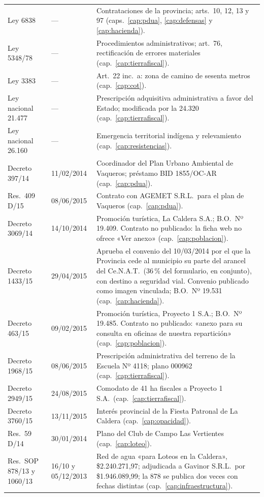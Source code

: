 \begin{longtable}{@{}p{3.2cm}p{1.9cm}p{7.9cm}@{}}
Ley 6838 & --- & Contrataciones de la provincia; arts.\ 10, 12, 13 y 97 (caps.\ \ref{cap:pdua}, \ref{cap:defensas} y \ref{cap:hacienda}). \\
Ley 5348/78 & --- & Procedimientos administrativos; art.\ 76, rectificación de errores materiales (cap.\ \ref{cap:tierrafiscal}). \\
Ley 3383 & --- & Art.\ 22 inc.\ a: zona de camino de sesenta metros (cap.\ \ref{cap:cot}). \\
Ley nacional 21.477 & --- & Prescripción adquisitiva administrativa a favor del Estado; modificada por la 24.320 (cap.\ \ref{cap:tierrafiscal}). \\
Ley nacional 26.160 & --- & Emergencia territorial indígena y relevamiento (cap.\ \ref{cap:resistencias}). \\
Decreto 397/14 & 11/02/2014 & Coordinador del Plan Urbano Ambiental de Vaqueros; préstamo BID 1855/OC-AR (cap.\ \ref{cap:pdua}). \\
Res.\ 409 D/15 & 08/06/2015 & Contrato con AGEMET S.R.L.\ para el plan de Vaqueros (cap.\ \ref{cap:pdua}). \\
Decreto 3069/14 & 14/10/2014 & Promoción turística, La Caldera S.A.; B.O.\ Nº 19.409. Contrato no publicado: la ficha web no ofrece «Ver anexo» (cap.\ \ref{cap:poblacion}). \\
Decreto 1433/15 & 29/04/2015 & Aprueba el convenio del 10/03/2014 por el que la Provincia cede al municipio su parte del arancel del Ce.N.A.T.\ (36\,\% del formulario, en conjunto), con destino a seguridad vial. Convenio publicado como imagen vinculada; B.O.\ Nº 19.531 (cap.\ \ref{cap:hacienda}). \\
Decreto 463/15 & 09/02/2015 & Promoción turística, Proyecto 1 S.A.; B.O.\ Nº 19.485. Contrato no publicado: «anexo para su consulta en oficinas de nuestra repartición» (cap.\ \ref{cap:poblacion}). \\
Decreto 1968/15 & 08/06/2015 & Prescripción administrativa del terreno de la Escuela Nº 4118; plano 000962 (cap.\ \ref{cap:tierrafiscal}). \\
Decreto 2949/15 & 24/08/2015 & Comodato de 41 ha fiscales a Proyecto 1 S.A.\ (cap.\ \ref{cap:tierrafiscal}). \\
Decreto 3760/15 & 13/11/2015 & Interés provincial de la Fiesta Patronal de La Caldera (cap.\ \ref{cap:opacidad}). \\
Res.\ 59 D/14 & 30/01/2014 & Plano del Club de Campo Las Vertientes (cap.\ \ref{cap:loteo}). \\
Res.\ SOP 878/13 y 1060/13 & 16/10 y 05/12/2013 & Red de agua «para Loteos en la Caldera», \$2.240.271,97; adjudicada a Gavinor S.R.L.\ por \$1.946.089,99; la 878 se publica dos veces con fechas distintas (cap.\ \ref{cap:infraestructura}). \\

\end{longtable}
